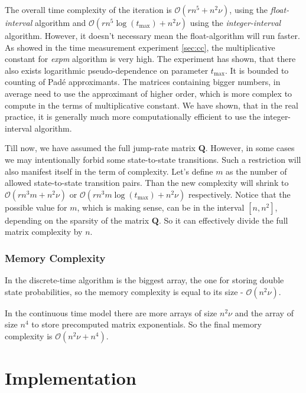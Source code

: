 \documentclass[thesis=M,english]{FITthesis}[2012/10/20]
\newcommand{\matr}[1]{\mathbf{#1}}
\begin{document}
\begin{itemize}
\begin{itemize}
\end{itemize}   

The overall time complexity of the iteration is $\mathcal{O}( r n^5 + n^2\nu )$, using the \textit{float-interval} algorithm and $\mathcal{O}( r n^5\log(t_{\max}) + n^2\nu )$ using the \textit{integer-interval} algorithm. However, it doesn't necessary mean the float-algorithm will run faster. As showed in the time measurement experiment \ref{sec:cc}, the multiplicative constant for \textit{expm} algorithm is very high. The experiment has shown, that there also exists logarithmic pseudo-dependence on parameter $t_{\max}$. It is bounded to counting of Pad\'{e} approximants. The matrices containing bigger numbers, in average need to use the approximant of higher order, which is more complex to compute in the terms of multiplicative constant. We have shown, that in the real practice, it is generally much more computationally efficient to use the integer-interval algorithm.

Till now, we have assumed the full jump-rate matrix $\matr{Q}$. However, in some cases we may intentionally forbid some state-to-state transitions. Such a restriction will also manifest itself in the term of complexity. Let's define $m$ as the number of allowed state-to-state transition pairs. Than the new complexity will shrink to $\mathcal{O}( r n^3 m + n^2\nu )$ or $\mathcal{O}( r n^3 m \log(t_{\max}) + n^2\nu )$ respectively. Notice that the possible value for $m$, which is making sense, can be in the interval $[n,n^2]$, depending on the sparsity of the matrix $\matr{Q}$. So it can effectively divide the full matrix complexity by $n$.  

\end{itemize}

\subsection{Memory Complexity}
In the discrete-time algorithm is the biggest array, the one for storing double state probabilities, so the memory complexity is equal to its size - $\mathcal{O}(n^2\nu)$. 

In the continuous time model there are more arrays of size $n^2\nu$ and the array of size $n^4$ to store precomputed matrix exponentials. So the final memory complexity is $\mathcal{O}( n^2\nu + n^4 )$.

\chapter{Implementation}
\end{document}
